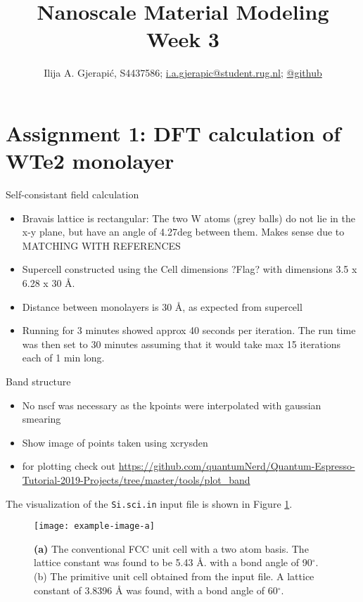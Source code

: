 \documentclass[10pt,a4paper]{labreport}
\title{Nanoscale Material Modeling
\\
\normalsize{Week 3}} %
\author{Ilija A. Gjerapić, S4437586; \href{mailto:i.a.gjerapic@student.rug.nl}{i.a.gjerapic@student.rug.nl}; \href{https://github.com/igjerapic/nmm-week3/}{@github} } %
\begin{document}
\maketitle



  

\thispagestyle{firststyle}
\newpage
\section{Assignment 1: DFT calculation of WTe2 monolayer}
Self-consistant field calculation
\begin{itemize}
    \item Bravais lattice is rectangular: The two W atoms (grey balls) do not lie in the x-y plane, but have an angle of 4.27deg between them. Makes sense due to {\color{red} MATCHING WITH REFERENCES}
  
    \item Supercell constructed using the Cell dimensions ?Flag? with dimensions 3.5 x 6.28 x 30 \AA. 
    \item Distance between monolayers is 30 \AA, as expected from supercell
    \item Running for 3 minutes showed approx 40 seconds per iteration. The run time was then set to 30 minutes assuming that it would take max 15 iterations each of 1 min long. 
  \end{itemize}

  Band structure
  \begin{itemize}
    \item No nscf was necessary as the kpoints were interpolated with gaussian smearing
    \item Show image of points taken using xcrysden
    \item for plotting check out \url{https://github.com/quantumNerd/Quantum-Espresso-Tutorial-2019-Projects/tree/master/tools/plot_band} 
  \end{itemize}
  The visualization of the \texttt{Si.sci.in} input file is shown in Figure \ref{fig:ass1_cryst}. 
  \begin{figure}[h]
    \centering 
    \texttt{[image: example-image-a]}
    \caption{\textbf{(a)} The conventional FCC unit cell with a two atom basis. The lattice constant was found to be 5.43 \AA. with a bond angle of 90$^\circ$. (b) The primitive unit cell obtained from the input file. A lattice constant of 3.8396 {\AA} was found, with a bond angle of 60$^\circ$.}
    \label{fig:ass1_cryst}
  \end{figure}
\end{document}

